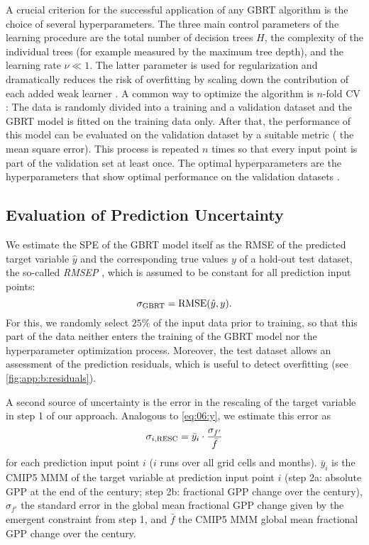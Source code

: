 A crucial criterion for the successful application of any \ac{GBRT} algorithm
is the choice of several hyperparameters. The three main control parameters of
the learning procedure are the total number of decision trees $H$, the
complexity of the individual trees (for example measured by the maximum tree
depth), and the learning rate $\nu \ll 1$. The latter parameter is used for
regularization and dramatically reduces the risk of overfitting by scaling down
the contribution of each added weak learner \autocite{Death2007, Elith2008,
  Friedman2001}. A common way to optimize the algorithm is $n$-fold \acf{CV}
\autocite{Bishop2006}: The data is randomly divided into a training and a
validation dataset and the \acs{GBRT} model is fitted on the training data
only. After that, the performance of this model can be evaluated on the
validation dataset by a suitable metric (\eg{} the mean square error). This
process is repeated $n$ times so that every input point is part of the
validation set at least once. The optimal hyperparameters are the
hyperparameters that show optimal performance on the validation datasets
\autocite{Elith2008}.


\subsection{Evaluation of Prediction Uncertainty}
\label{subsec:app:b:uncertainty}

We estimate the \acf{SPE} of the \ac{GBRT} model itself as the \ac{RMSE} of the
predicted target variable $\hat{y}$ and the corresponding true values $y$ of a
hold-out test dataset, the so-called \emph{\acf{RMSEP}} \autocite{Bishop2006},
which is assumed to be constant for all prediction input points:
\begin{equation}
  \sigma_{\textnormal{GBRT}} = \textnormal{RMSE}(\hat{y}, y).
  \label{eq:app:b:sigma_gbrt}
\end{equation}
For this, we randomly select $25 \unit{\%}$ of the input data prior to
training, so that this part of the data neither enters the training of the
\ac{GBRT} model nor the hyperparameter optimization process. Moreover, the test
dataset allows an assessment of the prediction residuals, which is useful to
detect overfitting (see \cref{fig:app:b:residuals}).

A second source of uncertainty is the error in the rescaling of the target
variable in step 1 of our approach. Analogous to \cref{eq:06:y}, we estimate
this error as
\begin{equation}
  \sigma_{i, \textnormal{RESC}} = \bar{y}_i \cdot \frac{\sigma_{f'}}{\bar{f}}
  \label{eq:app:b:sigma_rescaling}
\end{equation}
for each prediction input point $i$ ($i$ runs over all grid cells and months).
$\bar{y}_i$ is the \acs{CMIP}5 \acf{MMM} of the target variable at prediction
input point $i$ (step 2a: absolute \ac{GPP} at the end of the  century;
step 2b: fractional \ac{GPP} change over the  century), $\sigma_{f'}$
the standard error in the global mean fractional \acs{GPP} change given by the
emergent constraint from step 1, and $\bar{f}$ the \acs{CMIP}5 \ac{MMM} global
mean fractional \ac{GPP} change over the  century.

